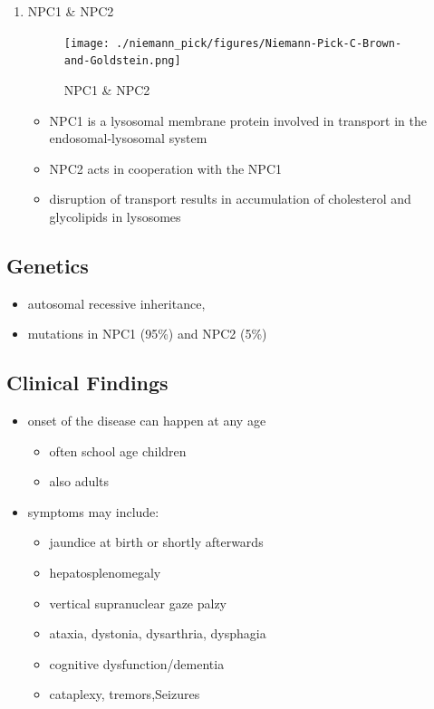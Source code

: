 \documentclass{scrartcl}
\begin{document}
\begin{enumerate}
\item NPC1 \& NPC2
\label{sec:org20faf25}

\begin{figure}[htbp]
\centering
\texttt{[image: ./niemann\_pick/figures/Niemann-Pick-C-Brown-and-Goldstein.png]}
\caption{\label{fig:orgb095055}
NPC1 \& NPC2}
\end{figure}

\begin{itemize}
\item NPC1 is a lysosomal membrane protein involved in transport in the endosomal-lysosomal system
\item NPC2 acts in cooperation with the NPC1
\item disruption of transport results in accumulation of cholesterol and glycolipids in lysosomes
\end{itemize}
\end{enumerate}

\subsection{Genetics}
\label{sec:org860a9fd}
\begin{itemize}
\item autosomal recessive inheritance,
\item mutations in NPC1 (95\%) and NPC2 (5\%)
\end{itemize}

\subsection{Clinical Findings}
\label{sec:org7bf88b3}
\begin{itemize}
\item onset of the disease can happen at any age
\begin{itemize}
\item often school age children
\item also adults
\end{itemize}

\item symptoms may include:
\begin{itemize}
\item jaundice at birth or shortly afterwards
\item hepatosplenomegaly
\item vertical supranuclear gaze palzy
\item ataxia, dystonia, dysarthria, dysphagia
\item cognitive dysfunction/dementia
\item cataplexy, tremors,Seizures
\end{itemize}
\end{itemize}
\end{document}
